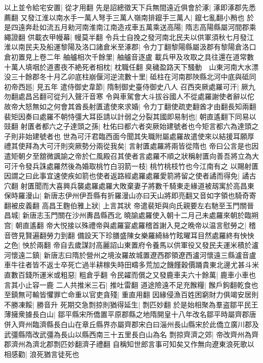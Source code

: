 以上並令給宅安置|{
	從才用翻}
先是詔總徵天下兵無間遠近俱會於涿|{
	涿即涿郡先悉薦翻}
又發江淮以南水手一萬人弩手三萬人嶺南排鑹手三萬人|{
	鑹七亂翻小矟也}
於是四遠奔赴如流五月勑河南淮南江南造戎車五萬乘送高陽|{
	隋志高陽縣屬河間郡乘繩證翻}
供載衣甲幔幕|{
	幔莫半翻}
令兵士自挽之發河南北民夫以供軍須秋七月發江淮以南民夫及船運黎陽及洛口諸倉米至涿郡|{
	令力丁翻黎陽縣屬汲郡有黎陽倉洛口倉初置見上卷二年}
舳艫相次千餘里|{
	舳艫音逐盧}
載兵甲及攻取之具往還在道常數十萬人填咽於道晝夜不絶死者相枕|{
	枕職任翻}
臭穢盈路天下騷動　山東河南大水漂没三十餘郡冬十月乙卯底柱崩偃河逆流數十里|{
	砥柱在河南郡陜縣北河中底與砥同}
初帝西廵|{
	見五年}
遣侍御史韋節|{
	隋制御史臺侍御史八人}
召西突厥處羅可汗|{
	厥九勿翻處昌呂翻可從刋入聲汗音寒}
令與車駕會大斗拔谷國人不從處羅謝使者辭以佗故帝大怒無如之何會其酋長射匱遣使來求婚|{
	令力丁翻使疏吏翻酋才由翻長知兩翻}
裴矩因奏曰處羅不朝恃彊大耳臣請以計弱之分裂其國即易制也|{
	朝直遙翻下同易以豉翻}
射匱者都六之子達頭之孫|{
	杜佑曰都六者突厥始建號者也今矩言都六為達頭之子則非始建號者也}
世為可汗君臨西面今聞其失職附屬處羅故遣使來以結援耳願厚禮其使拜為大可汗則突厥勢分兩從我矣|{
	言射匱處羅將兩皆從隋也}
帝曰公言是也因遣矩朝夕至舘微諷諭之帝於仁風殿召其使者言處羅不順之狀稱射匱向善吾將立為大可汗令發兵誅處羅然後為婚取桃竹白羽箭一枝|{
	桃竹桃枝竹也今江南有之}
以賜射匱因謂之曰此事宜速使疾如箭也使者返路經處羅處羅愛箭將留之使者譎而得免|{
	譎古穴翻}
射匱聞而大喜興兵襲處羅處羅大敗棄妻子將數千騎東走緣道被刼寓於高昌東保時羅漫山|{
	新唐志伊州伊吾縣有折羅漫山亦曰天山將即亮翻又音如字領也騎奇寄翻被皮義翻}
高昌王麴伯雅上狀|{
	上言其狀}
帝遣裴矩與向氏親要左右馳至玉門關晉昌城|{
	新唐志玉門關在沙州夀昌縣西北}
曉諭處羅使入朝十二月己未處羅來朝於臨朔宫|{
	朝直遙翻}
帝大悦接以殊禮帝與處羅宴處羅稽首謝入見之晩帝以温言慰勞之|{
	稽音啓見賢遍翻勞力到翻}
備設天下珍膳盛陳女樂羅綺絲竹眩曜耳目然處羅終有怏怏之色|{
	怏於兩翻}
帝自去歲謀討高麗詔山東置府令養馬以供軍役又發民夫運米積於瀘河懷遠二鎮|{
	新唐志曰隋於營州之境汝羅故城置遼西郡領遼西瀘河懷遠三縣瀘音盧}
車牛往者皆不返士卒死亡過半耕稼失時田疇多荒加之饑饉穀價踊貴東北邊尤甚斗米直數百錢所運米或粗惡|{
	粗倉乎翻}
令民糴而償之又發鹿車夫六十餘萬|{
	鹿車小車也言其小止容一鹿}
二人共推米三石|{
	推吐雷翻}
道途險遠不足充餱糧|{
	餱戶鉤翻乾食也}
至鎮無可輸皆懼罪亡命重以官吏貪殘|{
	重直用翻}
因緣侵漁百姓困窮財力俱竭安居則不勝凍餒|{
	勝音升}
死期交急剽掠則猶得延生|{
	剽匹妙翻}
於是始相聚為羣盗鄒平民王薄擁衆據長白山|{
	鄒平縣宋所僑置平原郡縣之地隋開皇十八年改名鄒平時屬齊郡唐併入齊州臨濟縣長白山在章丘縣界亦屬齊郡宋白曰淄州長山縣宋於此僑立廣川郡及武彊縣隋改武彊為長山以縣西南三十五里長白山為名}
剽掠齊濟之郊|{
	帝改齊州為齊郡濟州為濟北郡剽匹妙翻濟子禮翻}
自稱知世郎言事可知矣又作無向遼東浪死歌以相感勸|{
	浪死猶言徒死也}
